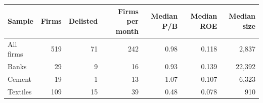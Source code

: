 \begin{tabular}{lrrrrrr}
\toprule
Sample & Firms & Delisted & Firms per month & Median P/B & Median ROE & Median size \\
\midrule
All firms & 519 & 71 & 242 & 0.98 & 0.118 & 2,837 \\
Banks & 29 & 9 & 16 & 0.93 & 0.139 & 22,392 \\
Cement & 19 & 1 & 13 & 1.07 & 0.107 & 6,323 \\
Textiles & 109 & 15 & 39 & 0.48 & 0.078 & 910 \\
\bottomrule
\end{tabular}
